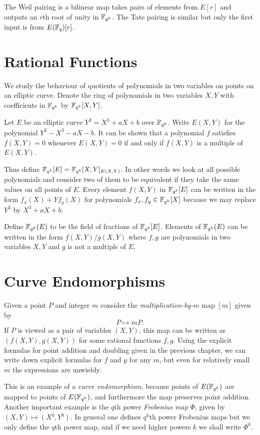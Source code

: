 The Weil pairing is a bilinear map
takes pairs of elements from $E[r]$ and outputs an $r$th root of unity
in $\mathbb{F}_{q^k}$. The Tate pairing is similar but only the first
input is from $E(\mathbb{F}_q)[r]$.

\section {Rational Functions}

We study the behaviour of quotients of polynomials in two variables on
points on an elliptic curve.
Denote the ring of polynomials in two variables $X,Y$
with coefficients in $\mathbb{F}_{q^k}$ by $\mathbb{F}_{q^k}[X,Y]$. 

Let $E$ be an elliptic curve $Y^2 = X^3 + aX + b$ over $\mathbb{F}_{q^k}$.
Write $E(X,Y)$ for the polynomial $Y^2 - X^3 - aX - b$.
It can be shown that a polynomial $f$ satisfies $f(X,Y) = 0$
whenever $E(X,Y) = 0$ if and only if $f(X,Y)$ is a multiple of $E(X,Y)$.

Thus define $\mathbb{F}_{q^k}[E] = \mathbb{F}_{q^k}[X,Y]_{E(X,Y)}$. In other words we look at all
possible polynomials and consider two of them to be
equivalent if they take the same values on all points of $E$.
Every element $f(X,Y)$ in $\mathbb{F}_{q^k}[E]$ can be written in the form
$f_x(X) + Y f_y(X)$ for polynomials $f_x, f_y \in \mathbb{F}_{q^k}[X]$ because
we may replace $Y^2$ by $X^3 + aX + b$.

Define $\mathbb{F}_{q^k}(E)$ to be the field of fractions of $\mathbb{F}_{q^k}[E]$.
Elements of $\mathbb{F}_{q^k}(E)$ can be written in the form
$f(X,Y) / g(X,Y)$ where $f, g$ are polynomials in two variables $X, Y$
and $g$ is not a multiple of $E$.

\section {\label{sec:eigenspace}Curve Endomorphisms}

Given a point $P$ and integer $m$ consider the \emph{multiplication-by-$m$}
map $[m]$ given by \[ P \mapsto m P . \]
If $P$ is viewed as a pair of variables $(X,Y)$, this map
can be written as $(f(X,Y), g(X,Y))$ for some rational functions $f,g$.
Using the explicit formulas for point addition and doubling
given in the previous chapter, we can write down
explicit formulas for $f$ and $g$ for any $m$, but even for relatively
small $m$ the expressions are unwieldy.

This is an example of a \emph{curve endomorphism}, because points of
$E(\mathbb{F}_{q^k})$ are mapped to points of $E(\mathbb{F}_{q^k})$, and furthermore the map
preserves point addition. Another important example
is the $q$th power \emph{Frobenius map} $\Phi$,
given by $(X, Y) \mapsto (X^{q}, Y^{q})$. In general one defines
$q^k$th power Frobenius maps but we only define the $q$th power map,
and if we need higher powers $k$ we shall write $\Phi^k$.

